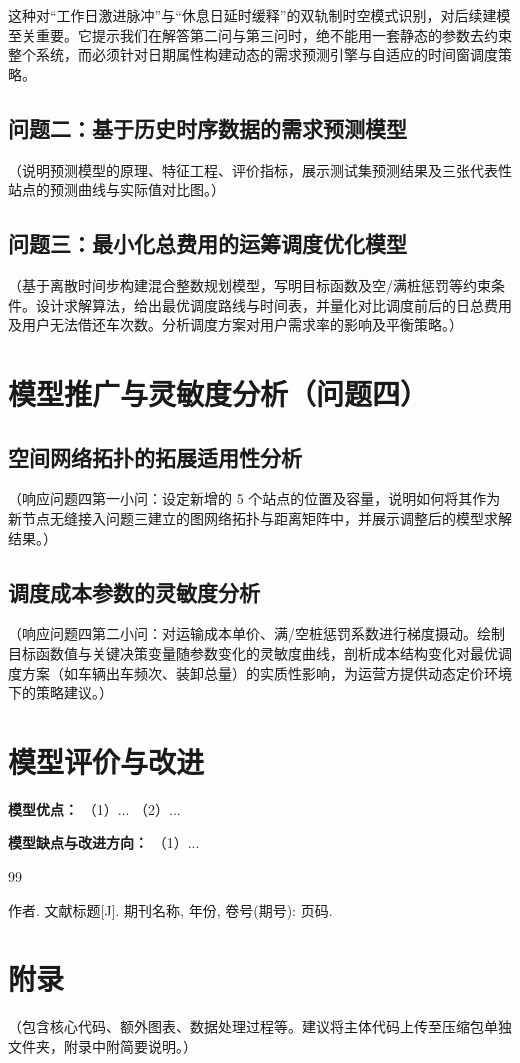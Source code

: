 \documentclass[a4paper, 12pt]{ctexart}
\begin{document}
这种对“工作日激进脉冲”与“休息日延时缓释”的双轨制时空模式识别，对后续建模至关重要。它提示我们在解答第二问与第三问时，绝不能用一套静态的参数去约束整个系统，而必须针对日期属性构建动态的需求预测引擎与自适应的时间窗调度策略。

\subsection{问题二：基于历史时序数据的需求预测模型} 
（说明预测模型的原理、特征工程、评价指标，展示测试集预测结果及三张代表性站点的预测曲线与实际值对比图。）

\subsection{问题三：最小化总费用的运筹调度优化模型} 
（基于离散时间步构建混合整数规划模型，写明目标函数及空/满桩惩罚等约束条件。设计求解算法，给出最优调度路线与时间表，并量化对比调度前后的日总费用及用户无法借还车次数。分析调度方案对用户需求率的影响及平衡策略。）


\section{模型推广与灵敏度分析（问题四）} 

\subsection{空间网络拓扑的拓展适用性分析}
（响应问题四第一小问：设定新增的 5 个站点的位置及容量，说明如何将其作为新节点无缝接入问题三建立的图网络拓扑与距离矩阵中，并展示调整后的模型求解结果。）

\subsection{调度成本参数的灵敏度分析}
（响应问题四第二小问：对运输成本单价、满/空桩惩罚系数进行梯度摄动。绘制目标函数值与关键决策变量随参数变化的灵敏度曲线，剖析成本结构变化对最优调度方案（如车辆出车频次、装卸总量）的实质性影响，为运营方提供动态定价环境下的策略建议。）

\section{模型评价与改进} 
\textbf{模型优点：}
（1）...
（2）...

\textbf{模型缺点与改进方向：} 
（1）...

\newpage
\begin{thebibliography}{99}
 作者. 文献标题[J]. 期刊名称, 年份, 卷号(期号): 页码.
\end{thebibliography}

\newpage
\section*{附录}
（包含核心代码、额外图表、数据处理过程等。建议将主体代码上传至压缩包单独文件夹，附录中附简要说明。）
\end{document}
